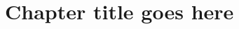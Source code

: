 \chapter{Chapter title goes here} \label{chap:chap-1}



\blindtext \parencite{einstein}

\Blindtext[4]